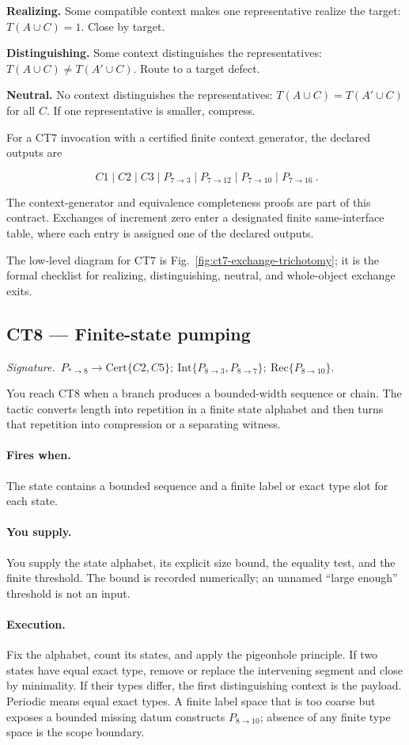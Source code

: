 \documentclass[
  11pt,
]{article}
\theoremstyle{definition}
\newcommand{\ctsignature}[1]{\par\noindent\emph{Signature.}\ #1\par\medskip}
\newcommand{\ctcert}[1]{\mathrm{Cert}\{#1\}}
\newcommand{\ctint}[1]{\mathrm{Int}\{#1\}}
\newcommand{\ctrec}[1]{\mathrm{Rec}\{#1\}}
\newcommand{\ctpar}[1]{\paragraph{#1.}}
\begin{document}
\textbf{Realizing.} Some compatible context makes one representative
realize the target: $T(A\cup C)=1$. Close by target.

\textbf{Distinguishing.} Some context distinguishes the representatives:
$T(A\cup C)\ne T(A'\cup C)$. Route to a target defect.

\textbf{Neutral.} No context distinguishes the representatives:
$T(A\cup C)=T(A'\cup C)$ for all $C$. If one representative is
smaller, compress.

For a CT7 invocation with a certified finite context generator, the
declared outputs are

\[
\boxed{\ C1\mid C2\mid C3\mid
P_{7\to3}\mid P_{7\to12}\mid P_{7\to10}\mid P_{7\to16}\ }.
\]

The context-generator and equivalence completeness proofs are part of this
contract. Exchanges of increment zero enter a designated finite
same-interface table, where each entry is assigned one of the declared
outputs.

The low-level diagram for CT7 is Fig.~\ref{fig:ct7-exchange-trichotomy};
it is the formal checklist for realizing, distinguishing, neutral, and
whole-object exchange exits.



\subsection{CT8 --- Finite-state pumping}\label{ct:8}\label{the-finite-state-pumping-principle}
\ctsignature{\(P_{\ast\to8}\to \ctcert{C2,C5};\ \ctint{P_{8\to3},P_{8\to7}};\ \ctrec{P_{8\to10}}\).}

You reach CT8 when a branch produces a bounded-width sequence or chain.
The tactic converts length into repetition in a finite state alphabet and
then turns that repetition into compression or a separating witness.

\ctpar{Fires when}
The state contains a bounded sequence and a finite label or exact type
slot for each state.

\ctpar{You supply}
You supply the state alphabet, its explicit size bound, the equality
test, and the finite threshold.  The bound is recorded numerically; an
unnamed ``large enough'' threshold is not an input.

\ctpar{Execution}
Fix the alphabet, count its states, and apply the pigeonhole principle.
If two states have equal exact type, remove or replace the intervening
segment and close by minimality.  If their types differ, the first
distinguishing context is the payload.  Periodic means equal exact types.
A finite label space that is too coarse but exposes a bounded missing
datum constructs \(P_{8\to10}\); absence of any finite type space is the
scope boundary.
\end{document}
